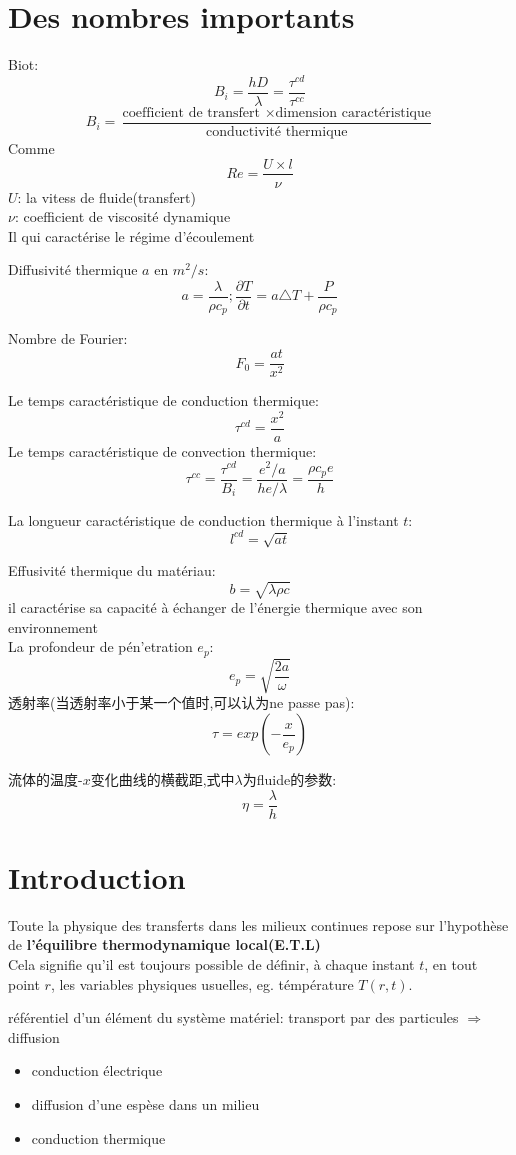 \documentclass{article}
\begin{document}
\section{Des nombres importants}
Biot:$$B_i = \frac{ hD}{\lambda }=\frac{\tau^{cd}}{\tau^{cc}}$$
$$B_i = \frac{ \text{coefficient de transfert } \times \text{dimension caract\'eristique} }{\text{conductivit\'e thermique}}$$
Comme $$Re=\frac{U\times l}{\nu}$$
$U$: la vitess de fluide(transfert)\\
$\nu$: coefficient de viscosit\'e dynamique\\
Il qui caract\'erise le r\'egime d'\'ecoulement

Diffusivit\'e thermique $a$ en $m^2/s$:$$a=\frac{\lambda }{\rho c_p};\frac{\partial T}{\partial t}=a\triangle T + \frac{P}{\rho c_p}$$

Nombre de Fourier:$$F_0=\frac{ at}{x^2}$$

Le temps caract\'eristique de conduction thermique:$$\tau^{cd}=\frac{x^2}{a}$$
Le temps caract\'eristique de convection thermique:$$\tau^{cc}=\frac{\tau^{cd}}{B_i}=\frac{e^2/a }{he/\lambda }=\frac{\rho c_p e}{h}$$

La longueur caract\'eristique de conduction thermique \`a l'instant $t$:$$l^{cd}=\sqrt{at}$$

Effusivit\'e thermique du mat\'eriau:$$b=\sqrt{\lambda \rho c}$$
il caract\'erise sa capacit\'e \`a \'echanger de l'\'energie thermique avec son environnement\\

La profondeur de p\'en'etration $e_p$:$$e_p=\sqrt{\frac{2a}{\omega}}$$
透射率(当透射率小于某一个值时,可以认为ne passe pas):$$\tau = exp(-\frac{x}{e_p})$$


流体的温度-$x$变化曲线的横截距,式中$\lambda$为fluide的参数:$$\eta=\frac{\lambda }{h}$$

\section{Introduction}
Toute la physique des transferts dans les milieux continues repose sur l'hypoth\`ese de \textbf{l'\'equilibre thermodynamique local(E.T.L)}\\
Cela signifie qu'il est toujours possible de d\'efinir, \`a chaque instant $t$, en tout point $r$, les variables physiques usuelles, eg. t\'emp\'erature $T(r,t)$.

\bigskip
r\'ef\'erentiel d'un \'el\'ement du syst\`eme mat\'eriel: transport par des particules $\Rightarrow$ diffusion
\begin{itemize}
\item conduction \'electrique
\item diffusion d'une esp\`ese dans un milieu
\item conduction thermique
\end{itemize}
\end{document}
